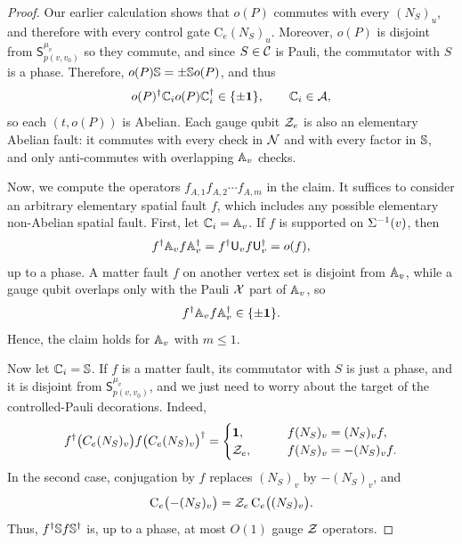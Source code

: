 \documentclass[11pt]{article}
\begin{document}
\begin{proof}
    Our earlier calculation shows that $o(P)$ commutes with every $({N_S})_u$, and therefore with every control gate $\mathrm{C}_e({N_S})_u$. Moreover, $o(P)$ is disjoint from $\mathsf{S}_{p(v,v_0)}^{\mu_v}$ so they commute, and since $S \in \mathcal{C}$ is Pauli, the commutator with $S$ is a phase. Therefore, $o(P)\mathbb{S} = \pm \mathbb{S} o(P)$, and thus 
    \[
    o(P)^\dagger \mathbb{C}_{i} o(P) \mathbb{C}_{i}^\dagger\in \{\pm \mathbf{1}\},\qquad \mathbb{C}_{i}\in \mathcal{A},
    \]
    so each $(t, o(P))$ is Abelian. 
    Each gauge qubit $\mathcal{Z}_e$ is also an elementary Abelian fault: it commutes with every check in $\mathcal{N}$ and with every factor in $\mathbb{S}$, and only anti-commutes with overlapping $\mathbb{A}_v$ checks.


    Now, we compute the operators $f_{A,1} f_{A,2} \cdots f_{A,m}$ in the claim. It suffices to consider an arbitrary elementary spatial fault $f$, which includes any possible elementary non-Abelian spatial fault.
    First, let $\mathbb{C}_{i}=\mathbb{A}_v$.
    If $f$ is supported on $\Sigma^{-1}(v)$, then
    \[
    f^\dagger \mathbb{A}_v f \mathbb{A}_v ^\dagger = f^\dagger \mathsf{U}_v f \mathsf{U}_v^\dagger = o(f),
    \]
    up to a phase. 
    A matter fault $f$ on another vertex set is disjoint from $\mathbb{A}_v$, while a gauge qubit overlaps only with the Pauli $\mathcal{X}$ part of $\mathbb{A}_v$, so 
    \[
    f^\dagger \mathbb{A}_v f \mathbb{A}_v^\dagger\in\{\pm\mathbf{1}\}.
    \]
    Hence, the claim holds for $\mathbb{A}_v$ with $m\le 1$.

    Now let $\mathbb{C}_{i}=\mathbb{S}$.
    If $f$ is a matter fault, its commutator with $S$ is just a phase, and it is disjoint from $\mathsf{S}_{p(v,v_0)}^{\mu_v}$, and we just need to worry about the target of the controlled-Pauli decorations.
    Indeed,
    \begin{equation}
        f^\dagger \bigl(C_e(N_{S})_v\bigr) f \bigl(C_e(N_{S})_v\bigr)^\dagger = \begin{cases}
            \mathbf{1},\qquad & f({N_{S}})_v = ({N_{S}})_v f,\\
            \mathcal{Z}_e,\qquad & f({N_{S}})_v = -({N_{S}})_v f.
        \end{cases}
    \end{equation}
    In the second case, conjugation by $f$ replaces $(N_S)_v$ by $-(N_S)_v$, and 
    \[
    \mathrm C_e\bigl(-(N_S)_v\bigr)
      =\mathcal{Z}_e\,\mathrm C_e\bigl((N_S)_v\bigr).
    \]
    Thus, $f^\dagger\mathbb{S} f \mathbb{S}^\dagger$ is, up to a phase, at most $O(1)$ gauge $\mathcal{Z}$ operators.  


\end{proof}
\end{document}
